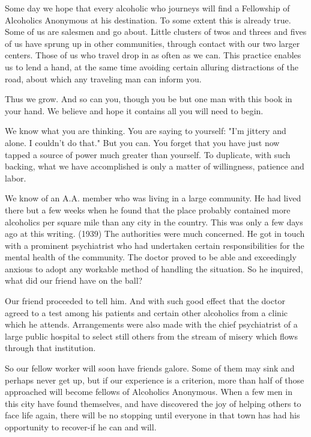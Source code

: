 \begin{biblechapter}
Some day we hope that every alcoholic who journeys will find a Fellowship of Alcoholics Anonymous at his destination.  To some extent this is already true.  Some of us are salesmen and go about.  Little clusters of twos and threes and fives of us have sprung up in other communities, through contact with our two larger centers.  Those of us who travel drop in as often as we can.  This practice enables us to lend a hand, at the same time avoiding certain alluring distractions of the road, about which any traveling man can inform you.

Thus we grow.  And so can you, though you be but one man with this book in your hand.  We believe and hope it contains all you will need to begin.

We know what you are thinking.  You are saying to yourself: "I'm jittery and alone.  I couldn't do that."  But you can.  You forget that you have just now tapped a source of power much greater than yourself.  To duplicate, with such backing, what we have accomplished is only a matter of willingness, patience and labor.

We know of an A.A. member who was living in a large community.  He had lived there but a few weeks when he found that the place probably contained more alcoholics per square mile than any city in the country.  This was only a few days ago at this writing.  (1939)  The authorities were much concerned.  He got in touch with a prominent psychiatrist who had undertaken certain responsibilities for the mental health of the community.  The doctor proved to be able and exceedingly anxious to adopt any workable method of handling the situation.  So he inquired, what did our friend have on the ball?

Our friend proceeded to tell him.  And with such good effect that the doctor agreed to a test among his patients and certain other alcoholics from a clinic which he attends.  Arrangements were also made with the chief psychiatrist of a large public hospital to select still others from the stream of misery which flows through that institution.

So our fellow worker will soon have friends galore.  Some of them may sink and perhaps never get up, but if our experience is a criterion, more than half of those approached will become fellows of Alcoholics Anonymous.  When a few men in this city have found themselves, and have discovered the joy of helping others to face life again, there will be no stopping until everyone in that town has had his opportunity to recover-if he can and will.


\end{biblechapter}
